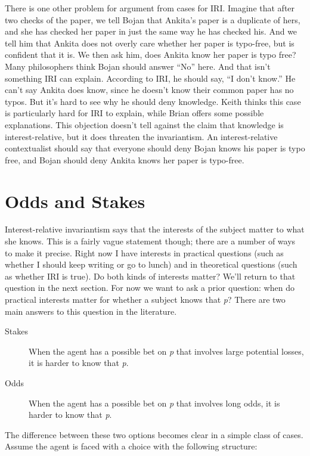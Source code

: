 \documentclass[11pt,oneside]{book}
\begin{document}
There is one other problem for argument from cases for IRI. Imagine that after two checks of the paper, we tell Bojan that Ankita's paper is a duplicate of hers, and she has checked her paper in just the same way he has checked his. And we tell him that Ankita does not overly care whether her paper is typo-free, but is confident that it is. We then ask him, does Ankita know her paper is typo free? Many philosophers think Bojan should answer ``No'' here. And that isn't something IRI can explain. According to IRI, he should say, ``I don't know.'' He can't say Ankita does know, since he doesn't know their common paper has no typos. But it's hard to see why he should deny knowledge. Keith  \citet[185]{DeRose2009} thinks this case is particularly hard for IRI to explain, while Brian  \citet{Kim2015} offers some possible explanations. This objection doesn't tell against the claim that knowledge is interest-relative, but it does threaten the invariantism. An interest-relative contextualist should say that everyone should deny Bojan knows his paper is typo free, and Bojan should deny Ankita knows her paper is typo-free.

\section{Odds and Stakes}
\label{oddsandstakes}

Interest-relative invariantism says that the interests of the subject matter to what she knows. This is a fairly vague statement though; there are a number of ways to make it precise. Right now I have interests in practical questions (such as whether I should keep writing or go to lunch) and in theoretical questions (such as whether IRI is true). Do both kinds of interests matter? We'll return to that question in the next section. For now we want to ask a prior question: when do practical interests matter for whether a subject knows that \emph{p}? There are two main answers to this question in the literature.

\begin{description}

\item[Stakes]

When the agent has a possible bet on \emph{p} that involves large potential losses, it is harder to know that \emph{p}.

\item[Odds]

When the agent has a possible bet on \emph{p} that involves long odds, it is harder to know that \emph{p}.
\end{description}
The difference between these two options becomes clear in a simple class of cases. Assume the agent is faced with a choice with the following structure:
\end{document}
